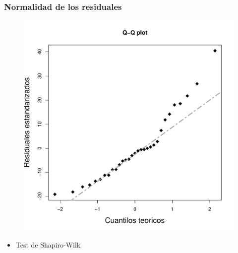 \documentclass[gray,handout,mathserif]{beamer}
\begin{document}
\begin{frame}[label=assumcheck2]
   \frametitle{Normalidad de los residuales}
   \vspace{-0.5cm}
   \begin{figure}
      \includegraphics[scale=0.4]{figs/nonorm1.pdf}
   \end{figure}
   \vspace{-0.7cm}
   \begin{itemize}
      \item<2-| visible@2-| handout:1> Test de Shapiro-Wilk
   \end{itemize}
\end{frame}%
\end{document}
